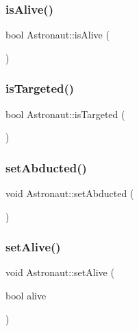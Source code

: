 \subsubsection{\texorpdfstring{is\+Alive()}{isAlive()}}
{\footnotesize\ttfamily bool Astronaut\+::is\+Alive (\begin{DoxyParamCaption}{ }\end{DoxyParamCaption})}

\mbox{\label{class_astronaut_abf65a970647ce5388dc8488e5fd232d3}} 
\subsubsection{\texorpdfstring{is\+Targeted()}{isTargeted()}}
{\footnotesize\ttfamily bool Astronaut\+::is\+Targeted (\begin{DoxyParamCaption}{ }\end{DoxyParamCaption})}

\mbox{\label{class_astronaut_a08c429446d2b203c6f0386bfd4ce746e}} 
\subsubsection{\texorpdfstring{set\+Abducted()}{setAbducted()}}
{\footnotesize\ttfamily void Astronaut\+::set\+Abducted (\begin{DoxyParamCaption}{ }\end{DoxyParamCaption})}

\mbox{\label{class_astronaut_ac969b5ce6219bb260e0c88a8ec57f459}} 
\subsubsection{\texorpdfstring{set\+Alive()}{setAlive()}}
{\footnotesize\ttfamily void Astronaut\+::set\+Alive (\begin{DoxyParamCaption}\item[{bool}]{alive }\end{DoxyParamCaption})}

\mbox{\label{class_astronaut_aca642a5da85bd7546c7750d87ffdad5c}} 
